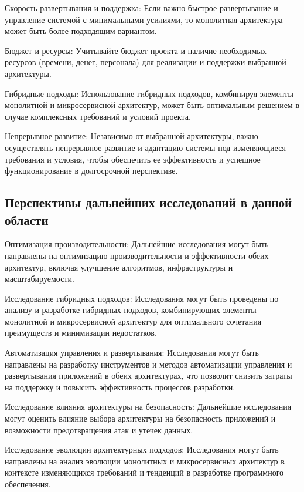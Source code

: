     Скорость развертывания и поддержка: Если важно быстрое развертывание и управление системой с минимальными усилиями, то монолитная архитектура может быть более подходящим вариантом.

    Бюджет и ресурсы: Учитывайте бюджет проекта и наличие необходимых ресурсов (времени, денег, персонала) для реализации и поддержки выбранной архитектуры.

    Гибридные подходы: Использование гибридных подходов, комбинируя элементы монолитной и микросервисной архитектур, может быть оптимальным решением в случае комплексных требований и условий проекта.

    Непрерывное развитие: Независимо от выбранной архитектуры, важно осуществлять непрерывное развитие и адаптацию системы под изменяющиеся требования и условия, чтобы обеспечить ее эффективность и успешное функционирование в долгосрочной перспективе.



\subsection*{Перспективы дальнейших исследований в данной области}

    Оптимизация производительности: Дальнейшие исследования могут быть направлены на оптимизацию производительности и эффективности обеих архитектур, включая улучшение алгоритмов, инфраструктуры и масштабируемости.

    Исследование гибридных подходов: Исследования могут быть проведены по анализу и разработке гибридных подходов, комбинирующих элементы монолитной и микросервисной архитектур для оптимального сочетания преимуществ и минимизации недостатков.

    Автоматизация управления и развертывания: Исследования могут быть направлены на разработку инструментов и методов автоматизации управления и развертывания приложений в обеих архитектурах, что позволит снизить затраты на поддержку и повысить эффективность процессов разработки.

    Исследование влияния архитектуры на безопасность: Дальнейшие исследования могут оценить влияние выбора архитектуры на безопасность приложений и возможности предотвращения атак и утечек данных.

    Исследование эволюции архитектурных подходов: Исследования могут быть направлены на анализ эволюции монолитных и микросервисных архитектур в контексте изменяющихся требований и тенденций в разработке программного обеспечения.


